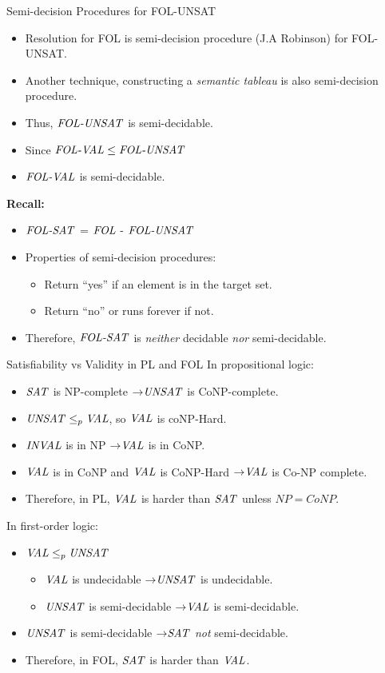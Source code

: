 \documentclass[style=sailor,size=12pt,mode=present]{powerdot}
\newcommand{\id}[1]{\mbox{\it #1\/}}
\theoremstyle{definition}
\begin{document}
\begin{wideslide}[bm=,toc=]{Semi-decision Procedures for FOL-UNSAT}
\begin{itemize}
\item Resolution for FOL is semi-decision procedure (J.A Robinson) for FOL-UNSAT.
\item Another technique, constructing a \emph{semantic tableau} is also
semi-decision procedure.
\item Thus, $\id{FOL-UNSAT}$ is semi-decidable.
\item Since $\id{FOL-VAL} \leq \id{FOL-UNSAT}$ 
\item $\id{FOL-VAL}$ is semi-decidable. 
\end{itemize}
{\bf Recall:} 
\begin{itemize}
\item $\id{FOL-SAT}$ = $\id{FOL}$ - $\id{FOL-UNSAT}$
\item Properties of semi-decision procedures:
\begin{itemize}
\item Return ``yes'' if an element is in the target set.
\item Return ``no'' or runs forever if not.
\end{itemize}
\item Therefore, $\id{FOL-SAT}$ is \emph{neither} decidable \emph{nor}
semi-decidable.
\end{itemize}

\end{wideslide}

\begin{wideslide}[bm=,toc=]{Satisfiability vs Validity in PL and FOL}
In propositional logic:
\begin{itemize}
\item $\id{SAT}$ is NP-complete $\imp \id{UNSAT}$ is CoNP-complete. 
\item $\id{UNSAT} \leq_p \id{VAL}$, so $\id{VAL}$ is coNP-Hard.
\item $\id{INVAL}$ is in NP $\imp \id{VAL}$ is in CoNP.
\item $\id{VAL}$ is in CoNP and $\id{VAL}$ is CoNP-Hard $\imp \id{VAL}$ is Co-NP
complete.
\item Therefore, in PL, $\id{VAL}$ is harder than $\id{SAT}$ unless $NP = CoNP$.
\end{itemize}
In first-order logic:
\begin{itemize}
\item $\id{VAL} \leq_p \id{UNSAT}$
\begin{itemize}
\item $\id{VAL}$ is undecidable $\imp \id{UNSAT}$ is undecidable. 
\item $\id{UNSAT}$ is semi-decidable $\imp \id{VAL}$ is semi-decidable. 
\end{itemize}
\item $\id{UNSAT}$ is semi-decidable $\imp \id{SAT}$ \emph{not} semi-decidable. 
\item Therefore, in FOL, $\id{SAT}$ is harder than $\id{VAL}$.
\end{itemize}
\end{wideslide}
\end{document}

